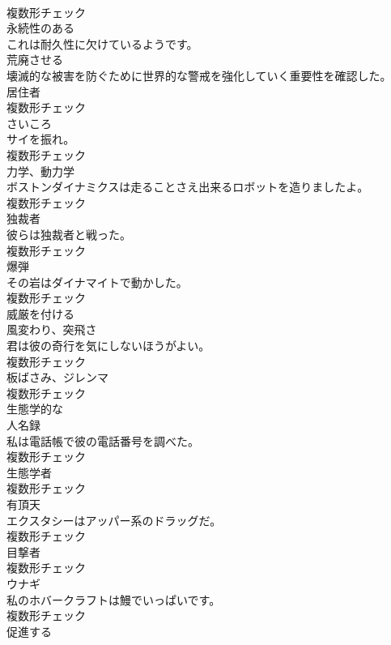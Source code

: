 \documentclass[8pt]{extreport}
\begin{document}
\begin{CJK}{UTF8}{min}
\\	複数形チェック
\\	[形容詞]	永続性のある	
\\	これは耐久性に欠けているようです。	
\\	[動詞]	荒廃させる	
\\	壊滅的な被害を防ぐために世界的な警戒を強化していく重要性を確認した。	
\\	[名詞]	居住者	
\\	複数形チェック
\\	[名詞]	さいころ	
\\	サイを振れ。	
\\	複数形チェック
\\	[名詞]	力学、動力学	
\\	ボストンダイナミクスは走ることさえ出来るロボットを造りましたよ。	
\\	複数形チェック
\\	[名詞]	独裁者	
\\	彼らは独裁者と戦った。	
\\	複数形チェック
\\	[名詞]	爆弾	
\\	その岩はダイナマイトで動かした。	
\\	複数形チェック
\\	[動詞]	威厳を付ける	
\\	[名詞]	風変わり、突飛さ	
\\	君は彼の奇行を気にしないほうがよい。	
\\	複数形チェック
\\	[名詞]	板ばさみ、ジレンマ	
\\	複数形チェック
\\	[形容詞]	生態学的な	
\\	[名詞]	人名録	
\\	私は電話帳で彼の電話番号を調べた。	
\\	複数形チェック
\\	[名詞]	生態学者	
\\	複数形チェック
\\	[名詞]	有頂天	
\\	エクスタシーはアッパー系のドラッグだ。	
\\	複数形チェック
\\	[名詞]	目撃者	
\\	複数形チェック
\\	[名詞]	ウナギ	
\\	私のホバークラフトは鰻でいっぱいです。	
\\	複数形チェック
\\	[動詞]	促進する	

\end{CJK}
\end{document}
